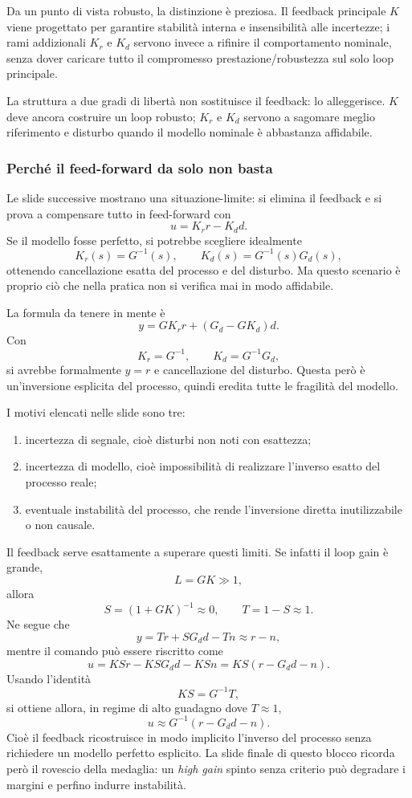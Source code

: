 \documentclass[11pt,a4paper]{article}
\begin{document}
Da un punto di vista robusto, la distinzione è preziosa. Il feedback principale $K$ viene progettato per garantire stabilità interna e insensibilità alle incertezze; i rami addizionali $K_r$ e $K_d$ servono invece a rifinire il comportamento nominale, senza dover caricare tutto il compromesso prestazione/robustezza sul solo loop principale.

\begin{keybox}
La struttura a due gradi di libertà non sostituisce il feedback: lo alleggerisce. $K$ deve ancora costruire un loop robusto; $K_r$ e $K_d$ servono a sagomare meglio riferimento e disturbo quando il modello nominale è abbastanza affidabile.
\end{keybox}

\subsubsection{Perché il feed-forward da solo non basta}

Le slide successive mostrano una situazione-limite: si elimina il feedback e si prova a compensare tutto in feed-forward con
$$
u = K_r r - K_d d.
$$
Se il modello fosse perfetto, si potrebbe scegliere idealmente
$$
K_r(s)=G^{-1}(s),
\qquad
K_d(s)=G^{-1}(s)G_d(s),
$$
ottenendo cancellazione esatta del processo e del disturbo. Ma questo scenario è proprio ciò che nella pratica non si verifica mai in modo affidabile.

La formula da tenere in mente è
$$
y = G K_r r + (G_d-GK_d)d.
$$
Con
$$
K_r=G^{-1},
\qquad
K_d=G^{-1}G_d,
$$
si avrebbe formalmente $y=r$ e cancellazione del disturbo. Questa però è un'inversione esplicita del processo, quindi eredita tutte le fragilità del modello.

I motivi elencati nelle slide sono tre:
\begin{enumerate}
    \item incertezza di segnale, cioè disturbi non noti con esattezza;
    \item incertezza di modello, cioè impossibilità di realizzare l'inverso esatto del processo reale;
    \item eventuale instabilità del processo, che rende l'inversione diretta inutilizzabile o non causale.
\end{enumerate}

Il feedback serve esattamente a superare questi limiti. Se infatti il loop gain è grande,
$$
L = GK \gg 1,
$$
allora
$$
S = (1+GK)^{-1} \approx 0,
\qquad
T = 1-S \approx 1.
$$
Ne segue che
$$
y = Tr + SG_d d - Tn \approx r-n,
$$
mentre il comando può essere riscritto come
$$
u = KSr - KSG_d d - KSn
=
KS(r-G_d d-n).
$$
Usando l'identità
$$
KS = G^{-1}T,
$$
si ottiene allora, in regime di alto guadagno dove $T\approx 1$,
$$
u \approx G^{-1}(r-G_d d-n).
$$
Cioè il feedback ricostruisce in modo implicito l'inverso del processo senza richiedere un modello perfetto esplicito. La slide finale di questo blocco ricorda però il rovescio della medaglia: un \emph{high gain} spinto senza criterio può degradare i margini e perfino indurre instabilità.
\end{document}
